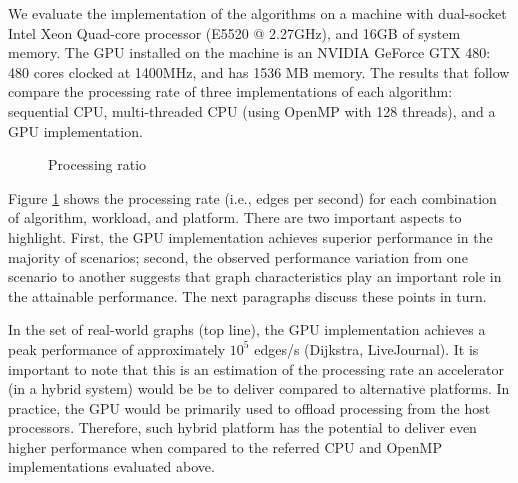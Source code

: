 We evaluate the implementation of the algorithms on a machine with dual-socket Intel Xeon Quad-core processor (E5520 @ 2.27GHz), and 16GB of system memory. The GPU installed on the machine is an NVIDIA GeForce GTX 480: 480 cores clocked at 1400MHz, and has 1536 MB memory. The results that follow compare the processing rate of three implementations of each algorithm: sequential CPU, multi-threaded CPU (using OpenMP with 128 threads), and a GPU implementation.

\begin{figure}[ht]
\begin{center}
\mbox{}
\caption{Processing ratio}
\label{fig:rate}
\end{center}
\end{figure}

Figure \ref{fig:rate} shows the processing rate (i.e., edges per second) for each combination of algorithm, workload, and platform. There are two important aspects to highlight. First, the GPU implementation achieves superior performance in the majority of scenarios; second, the observed performance variation from one scenario to another suggests that graph characteristics play an important role in the attainable performance. The next paragraphs discuss these points in turn.

In the set of real-world graphs (top line), the GPU implementation achieves a peak performance of approximately $10^5$ edges/s (Dijkstra, LiveJournal). It is important to note that this is an estimation of the processing rate an accelerator (in a hybrid system) would be be to deliver compared to alternative platforms. In practice, the GPU would be primarily used to offload processing from the host processors. Therefore, such hybrid platform has the potential to deliver even higher performance when compared to the referred CPU and OpenMP implementations evaluated above.

